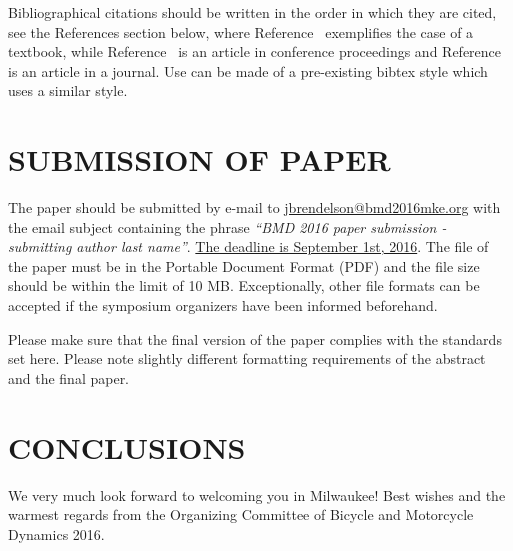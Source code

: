 \documentclass{bmd2016p}
\begin{document}
Bibliographical citations should be written in the order in which they are 
cited, see the References section below, where Reference~\cite{Pac02} 
exemplifies the case of a textbook, while Reference~\cite{Ber07} is an article 
in conference proceedings and Reference~\cite{Sha71} is an article in a 
journal. Use can be made of a pre-existing bibtex style which uses a similar 
style.


\section{SUBMISSION OF PAPER}

The paper should be submitted by e-mail to \href{mailto:jbrendelson@bmd2016mke.org}{jbrendelson@bmd2016mke.org} with the email subject containing the phrase \textit{``BMD 2016 paper submission - submitting author last name''}. \uline{The deadline is September 1st, 2016}. The file of the paper must be in the Portable Document Format (PDF) and the file size should be within the limit of 10 MB. Exceptionally, other file formats can be accepted if the symposium organizers have been informed beforehand. 

Please make sure that the final version of the paper complies with the standards set here. Please note slightly different formatting requirements of the abstract and the final paper.

\section{CONCLUSIONS}

We very much look forward to welcoming you in Milwaukee! Best wishes and the 
warmest regards from the Organizing Committee of Bicycle and Motorcycle 
Dynamics 2016.



\end{document}
